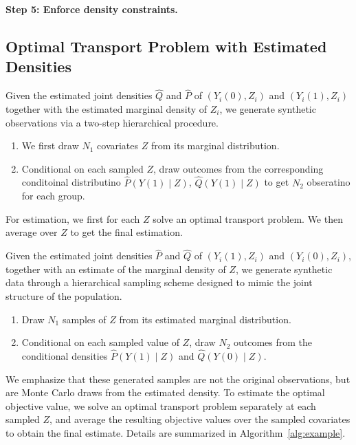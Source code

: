 \documentclass{article}
\theoremstyle{plain}
\theoremstyle{definition}
\def\PP{P}
\def\QQ{Q}
\theoremstyle{plain}
\begin{document}
\begin{algorithm}[tbp]
\BlankLine
\textbf{Step 5: Enforce density constraints.}\\



\;

\caption{Boundary-corrected wavelet density estimator for the joint density of $(Y,Z)$}
\label{alg:bc_wavelet_joint_density}
\end{algorithm}

\subsection{Optimal Transport Problem with Estimated Densities}

Given the estimated joint densities $\widehat{\QQ}$ and $\widehat{\PP}$ of $(Y_i(0), Z_i)$ and $(Y_i(1), Z_i)$
together with the estimated marginal density of $Z_i$, we generate synthetic
observations via a two-step hierarchical procedure.
\begin{enumerate}
    \item We first draw $N_1$ covariates $Z$ from
its marginal distribution.
    \item Conditional on each sampled $Z$, draw outcomes from the corresponding conditoinal distributino $\widehat{\PP}(Y(1)\mid Z)$, $\widehat{\QQ}(Y(1)\mid Z)$ to get $N_2$ obseratino for each group.
\end{enumerate}
For estimation, we first for each $Z$ solve an optimal transport problem. We then average over $Z$ to get the final estimation.



Given the estimated joint densities $\widehat{P}$ and $\widehat{Q}$
of $(Y_i(1), Z_i)$ and $(Y_i(0), Z_i)$, together with an estimate of the
marginal density of $Z$, we generate synthetic data through a hierarchical
sampling scheme designed to mimic the joint structure of the population.
\begin{enumerate}
    \item Draw $N_1$ samples of $Z$ from its estimated marginal distribution.
    \item Conditional on each sampled value of $Z$, draw $N_2$ outcomes from the conditional densities $\widehat{P}(Y(1)\mid Z)$ and $\widehat{Q}(Y(0)\mid Z)$.
\end{enumerate}
We emphasize that these
generated samples are not the original observations, but are Monte Carlo draws from the estimated density.
To estimate the optimal objective value, we solve an optimal transport problem separately at each
sampled $Z$, and average the resulting objective values over the sampled
covariates to obtain the final estimate.
Details are summarized in Algorithm~\ref{alg:example}.
\end{document}
